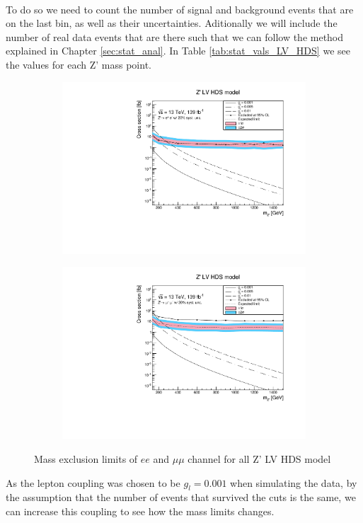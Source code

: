 \documentclass[14pt, a4paper]{book}
\begin{document}
\\To do so we need to count the number of signal and background events that are on the last bin, as well as their uncertainties. Aditionally we will include the number of real data events that are there such that we can follow the 
method explained in Chapter \ref{sec:stat_anal}. In Table \ref{tab:stat_vals_LV_HDS} we see the values for each Z' mass point.
\begin{figure}[!ht]
	\centering
   \begin{subfigure}[b]{0.49\textwidth}
      \centering
      \includegraphics[width=1\textwidth]{Limits/LV_HDS/mass_exclusion_ee.pdf}
      \end{subfigure}
   \hfill
   \begin{subfigure}[b]{0.49\textwidth}
      \centering
      \includegraphics[width=1\textwidth]{Limits/LV_HDS/mass_exclusion_uu.pdf}
      \end{subfigure}
   \caption{Mass exclusion limits of $ee$ and $\mu\mu$ channel for all Z' LV HDS model}\label{fig:LV_HDS_exclusion_ee_uu}
\end{figure}
As the lepton coupling was chosen to be $g_l=0.001$ when simulating the data, by the assumption that the number of events that survived the cuts is the same, we can increase this coupling to see how the mass limits changes.
\end{document}
